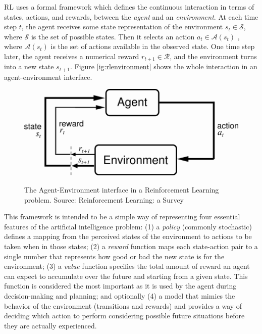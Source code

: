 RL uses a formal framework which defines the continuous interaction in terms of states, actions, and rewards, between the \textit{agent} and an \textit{environment}\cite{sutton1998reinforcement}. At each time step $t$, the agent receives some state representation of the environment $s_t \in \mathcal{S}$, where $\mathcal{S}$ is the set of possible states. Then it selects an action $a_t \in \mathcal{A}(s_t)$ , where $\mathcal{A}(s_t)$ is the set of actions available in the observed state. One time step later, the agent receives a numerical reward $r_{t+1} \in \mathcal{R}$, and the environment turns into a new state $s_{t+1}$. Figure \ref{ig:rlenvironment} shows the whole interaction in an agent-environment interface.

 \begin{figure}[h]
\centering
\caption[Agent-Environment interface in a Reinforcement Learning problem]{The Agent-Environment interface in a Reinforcement Learning problem. Source: Reinforcement Learning: a Survey\cite{sutton1998reinforcement} }
\includegraphics[scale=2]{images/rlenvironment}
\label{fig:rlenvironment}
\end{figure}

This framework is intended to be a simple way of representing four essential features of the artificial intelligence problem: (1) a \textit{policy} (commonly stochastic) defines a mapping from the perceived states of the environment to actions to be taken when in those states; (2) a \textit{reward} function maps each state-action pair to a single number that represents how good or bad the new state is for the environment; (3) a \textit{value} function specifies the total amount of reward an agent can expect to accumulate over the future and starting from a given state. This function is considered the most important as it is used by the agent during decision-making and planning; and optionally (4) a model that mimics the behavior of the environment (transitions and rewards) and provides a way of deciding which action to perform considering possible future situations before they are actually experienced.

